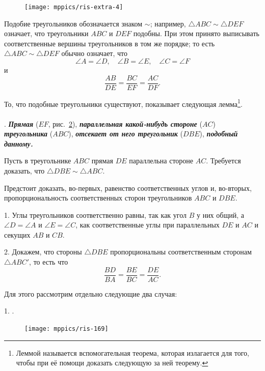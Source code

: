 \documentclass[twoside]{book}
\begin{document}
\begin{figure}[h!]
\centering
\texttt{[image: mppics/ris-extra-4]}
\caption{}\label{extra/ris-4}
\end{figure}

{\sloppy
Подобие треугольников обозначается знаком $\sim$;
например, $\triangle ABC\sim \triangle DEF$ означает, что треугольники $ABC$ и $DEF$ подобны.
При этом принято выписывать соответственные вершины треугольников в том же порядке;
то есть  $\triangle ABC\sim \triangle DEF$ обычно означает, что 
\[\angle A=\angle D,\quad
 \angle B=\angle E,\quad
 \angle C=\angle F
\]
и
\[\frac{AB}{DE}=\frac{BC}{EF}=\frac{AC}{DF}.\]

}

То, что подобные треугольники существуют, показывает следующая лемма\footnote{Леммой называется вспомогательная теорема, которая излагается для того, чтобы при её помощи доказать следующую за ней теорему.}.

{\sloppy

\paragraph{}\label{1938/159}
.
\textbf{\emph{Прямая}} ($EF$, рис.~\ref{1938/ris-169}), \textbf{\emph{параллельная какой-нибудь стороне}} ($AC$) \textbf{\emph{треугольника}} ($ABC$), \textbf{\emph{отсекает от него треугольник}} ($DBE$), \textbf{\emph{подобный данному.}}

}

Пусть в треугольнике $ABC$ прямая $DE$ параллельна стороне $AC$.
Требуется доказать, что $\triangle DBE\sim \triangle ABC$.

Предстоит доказать, во-первых, равенство соответственных углов и, во-вторых, пропорциональность соответственных сторон треугольников $ABC$ и $DBE$.

1.
Углы треугольников соответственно равны, так как угол $B$ у них общий, а $\angle D = \angle A$ и $\angle E= \angle C$, как соответственные углы при параллельных $DE$ и $AC$ и секущих $AB$ и $CB$.

2.
Докажем, что стороны $\triangle DBE$ пропорциональны соответственным сторонам $\triangle ABC'$, то есть что
\[\frac{BD}{BA}=\frac{BE}{BC}=\frac{DE}{AC}.\]

Для этого рассмотрим отдельно следующие два случая:

1.
.

\begin{figure}
\centering
\texttt{[image: mppics/ris-169]}
\caption{}\label{1938/ris-169}
\end{figure}
\end{document}
